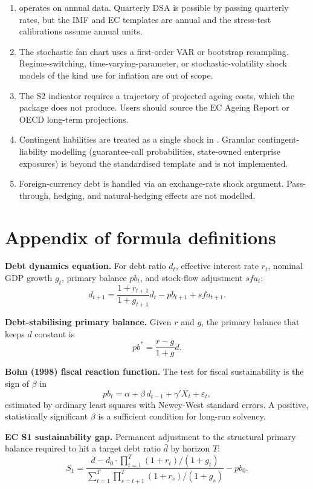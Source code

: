 \begin{enumerate}
\def\labelenumi{\arabic{enumi}.}
\tightlist
\item
   operates on annual data. Quarterly DSA is
  possible by passing quarterly rates, but the IMF and EC
  templates are annual and the stress-test calibrations assume
  annual units.
\item
  The stochastic fan chart uses a first-order VAR or bootstrap
  resampling. Regime-switching, time-varying-parameter, or
  stochastic-volatility shock models of the kind \citet{stock2007why}
  use for inflation are out of scope.
\item
  The S2 indicator requires a trajectory of projected ageing
  costs, which the package does not produce. Users should source
  the EC Ageing Report or OECD long-term projections.
\item
  Contingent liabilities are treated as a single shock in
  . Granular contingent-liability
  modelling (guarantee-call probabilities, state-owned enterprise
  exposures) is beyond the standardised template and is not
  implemented.
\item
  Foreign-currency debt is handled via an exchange-rate shock
  argument. Pass-through, hedging, and natural-hedging effects
  are not modelled.
\end{enumerate}

\section{Appendix of formula definitions}\label{appendix-of-formula-definitions}

\textbf{Debt dynamics equation.} For debt ratio \(d_t\), effective
interest rate \(r_t\), nominal GDP growth \(g_t\), primary balance
\(pb_t\), and stock-flow adjustment \(sfa_t\):
\[d_{t+1} = \frac{1 + r_{t+1}}{1 + g_{t+1}} d_t - pb_{t+1} + sfa_{t+1}.\]

\textbf{Debt-stabilising primary balance.} Given \(r\) and \(g\), the
primary balance that keeps \(d\) constant is
\[pb^* = \frac{r - g}{1 + g} d.\]

\textbf{Bohn (1998) fiscal reaction function.} The test for fiscal
sustainability is the sign of \(\beta\) in
\[pb_t = \alpha + \beta\, d_{t-1} + \gamma' X_t + \varepsilon_t,\]
estimated by ordinary least squares with Newey-West standard
errors. A positive, statistically significant \(\beta\) is a
sufficient condition for long-run solvency.

\textbf{EC S1 sustainability gap.} Permanent adjustment to the
structural primary balance required to hit a target debt ratio
\(\bar{d}\) by horizon \(T\):
\[S_1 = \frac{\bar{d} - d_0 \cdot \prod_{t=1}^{T} (1+r_t)/(1+g_t)}{\sum_{t=1}^{T}\prod_{s=t+1}^{T}(1+r_s)/(1+g_s)} - pb_0.\]

